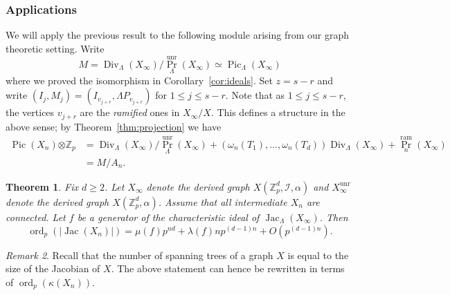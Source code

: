 \documentclass{amsart}
\newtheorem{theorem}{Theorem}[section]
\numberwithin{equation}{section}
\theoremstyle{remark}
\newtheorem{remark}[theorem]{Remark}
\newcommand{\Div}{\operatorname{Div}}
\newcommand{\Jac}{\operatorname{Jac}}
\newcommand{\Pic}{\operatorname{Pic}}
\newcommand{\ord}{\operatorname{ord}}
\newcommand{\unr}{\operatorname{unr}}
\newcommand{\ram}{\operatorname{ram}}
\newcommand{\Z}{\mathbb{Z}}
\theoremstyle{plain} %
\begin{document}
\subsubsection{Applications}
We will apply the previous result to the following module arising from our graph theoretic setting.
Write
\begin{equation}
\label{defn M}
M= \Div_\Lambda(X_\infty)/{\Pr}_\Lambda^{\unr}(X_\infty) {\simeq \Pic_{\Lambda}(X_\infty)}
\end{equation}
{where we proved the isomorphism in Corollary~\ref{cor:ideals}.}
Set $z=s-r$ and write $(I_j,M_j)=(I_{v_{j+r}},\Lambda P_{v_{j+r}})$ for $1 \le j \le s-r$.
Note that as $1\le j\le s-r$, the vertices $v_{j+r}$ are the \emph{ramified} ones in $X_\infty/X$.
This defines a structure in the above sense; by Theorem~\ref{thm:projection} we have
\begin{align*}
\Pic(X_n){\otimes \Z_p} &= \Div_{\Lambda}(X_\infty)/{\Pr}_\Lambda^{\unr}(X_\infty) + (\omega_n(T_1),\dots, \omega_n(T_d))\Div_\Lambda(X_\infty) + {\Pr}_n^{\ram}(X_\infty) \\
& = M/A_n.
\end{align*}

\begin{theorem}
\label{asymp formula}
Fix $d\geq 2$.
Let $X_\infty$ denote the derived graph $X(\Z_p^d,\mathcal{I},\alpha)$ and $X_\infty^{{\unr}}$ denote the derived graph $X(\Z_p^d,\alpha)$. Assume that all intermediate $X_n$ are connected.
Let $f$ be a generator of the characteristic ideal of $\Jac_\Lambda(X_\infty)$.
Then
\[
\ord_p(\vert \Jac(X_n)\vert) = \mu(f) p^{nd}+\lambda(f) np^{(d-1)n}+O(p^{(d-1)n}).
\]
\end{theorem}

\textcolor{blue}{}

\begin{remark}
Recall that the number of spanning trees of a graph $X$ is equal to the size of the Jacobian of $X$.
The above statement can hence be rewritten in terms of $\ord_p(\kappa(X_n))$.
\end{remark}
\end{document}
